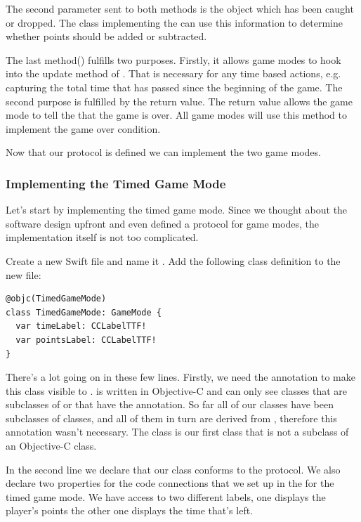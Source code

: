 The second parameter sent to both methods is the object which has been caught or dropped. The class implementing
the  can use this information to determine whether
points should be added or subtracted.

The last method() fulfills two purposes. Firstly, it
allows game modes to hook into the update method of . That
is necessary for any time based actions, e.g. capturing the total time that
has passed since the beginning of the game. The second purpose is fulfilled by
the  return value. The return value allows the game mode to
tell the  that the game is over. All game modes will use
this method to implement the game over condition.

Now that our protocol is defined we can implement the two game modes. 

\subsubsection{Implementing the Timed Game Mode}
Let's start by implementing the timed game mode. Since we thought about the
software design upfront and even defined a protocol for game modes, the
implementation itself is not too complicated.

\begin{leftbar}
Create a new Swift file and name it . Add the
following class definition to the new file:
\begin{lstlisting}
@objc(TimedGameMode)
class TimedGameMode: GameMode {
  var timeLabel: CCLabelTTF!
  var pointsLabel: CCLabelTTF!
}
\end{lstlisting}
\end{leftbar}
There's a lot going on in these few lines. Firstly, we need the
 annotation to make this class visible to \cocos{}. \cocos{}
is written in Objective-C and can only see classes that are subclasses of
 or that have the  annotation. So far all
of our classes have been subclasses of \cocos{} classes, and all of them in turn
are derived from , therefore this annotation wasn't
necessary. The  class is our first class that is not a
subclass of an Objective-C class.

In the second line we declare that our class conforms to the
 protocol. We also declare two properties
for the code connections that we set up in the \ccbfile{} for the timed game
mode. We have access to two different labels, one displays the player's
points the other one displays the time that's left.

